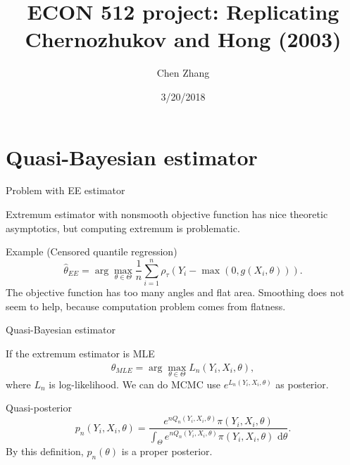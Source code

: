 \documentclass{beamer}
\title[ECON 512]{ECON 512 project: Replicating Chernozhukov and Hong (2003)}
\author{Chen Zhang}
\date{3/20/2018}
\begin{document}
\begin{frame}
  \titlepage
\end{frame}


\section{Quasi-Bayesian estimator}

\begin{frame}{Problem with EE estimator}


Extremum estimator with nonsmooth objective function has nice theoretic asymptotics, but computing extremum is problematic.
\vskip 0.5cm
\begin{block}{Example (Censored quantile regression)}
    \begin{equation*}
        \hat{\theta}_{EE} = \arg\max_{\theta\in\Theta}\frac{1}{n}\sum\limits_{i=1}^n\rho_{\tau}(Y_i-\max(0,g(X_i,\theta))).
    \end{equation*}
    The objective function has too many angles and flat area. Smoothing does not seem to help, because computation problem comes from flatness.
\end{block}

\end{frame}

\begin{frame}{Quasi-Bayesian estimator}

    If the extremum estimator is MLE
    \begin{equation*}
        \hat{\theta}_{MLE} = \arg\max_{\theta\in\Theta}L_n(Y_i,X_i,\theta), 
    \end{equation*}
    where $L_n$ is log-likelihood. We can do MCMC use $e^{L_n(Y_i,X_i,\theta)}$ as posterior.
\begin{block}{Quasi-posterior}
    \begin{equation*} p_n(Y_i,X_i,\theta)=\frac{e^{nQ_n(Y_i,X_i,\theta)}\pi(Y_i,X_i,\theta)}{\int_{\Theta}e^{nQ_n(Y_i,X_i,\theta)}\pi(Y_i,X_i,\theta)\mbox{ d}\theta }.
    \end{equation*}
    By this definition, $p_n(\theta)$ is a proper posterior.
\end{block}

\end{frame}
\end{document}
